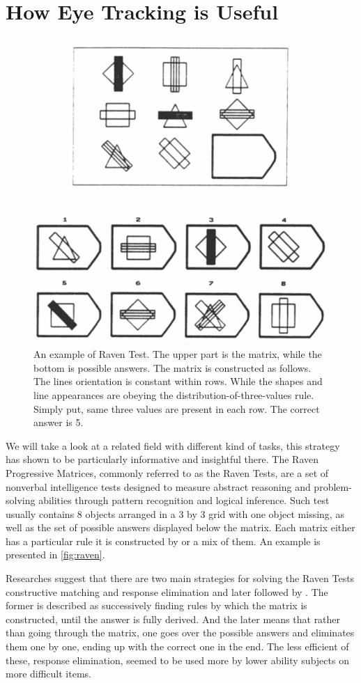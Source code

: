 \section{How Eye Tracking is Useful}
\begin{figure}
    \centering
    \includegraphics[width=0.5\linewidth]{images/raven_carpenter_1990.png}
    \caption{An example of Raven Test. The upper part is the matrix, while the bottom is possible answers. The matrix is constructed as follows. The lines orientation is constant within rows. While the shapes and line appearances are obeying the distribution-of-three-values rule. Simply put, same three values are present in each row. The correct answer is 5.}
    \label{fig:raven}
\end{figure}
We will take a look at a related field with different kind of tasks, this strategy has shown to be particularly informative and insightful there. 
The Raven Progressive Matrices, commonly referred to as the Raven Tests, are a set of nonverbal intelligence tests designed to measure abstract reasoning and problem-solving abilities through pattern recognition and logical inference. Such test usually contains 8 objects arranged in a 3 by 3 grid with one object missing, as well as the set of possible answers displayed below the matrix. Each matrix either has a particular rule it is constructed by or a mix of them. An example is presented in \autoref{fig:raven}. 

Researches suggest that there are two main strategies for solving the Raven Tests constructive matching and response elimination \citep{Bethel-Fox_1984} and later followed by \cite{Vigneau_2006}. The former is described as successively finding rules by which the matrix is constructed, until the answer is fully derived. And the later means that rather than going through the matrix, one goes over the possible answers and eliminates them one by one, ending up with the correct one in the end. The less efficient of these, response elimination, seemed to be used more by lower ability subjects on more difficult items. 

